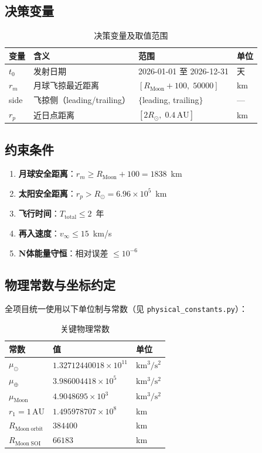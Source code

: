 \documentclass[a4paper,12pt]{article}
\begin{document}
\subsection{决策变量}

\begin{table}[H]
  \centering
  \caption{决策变量及取值范围}\label{tab:vars}
  \begin{tabular}{llll}
    \toprule
    变量 & 含义 & 范围 & 单位 \\
    \midrule
    $t_0$ & 发射日期 & 2026-01-01 至 2026-12-31 & 天 \\
    $r_m$ & 月球飞掠最近距离 & $[R_{\mathrm{Moon}}+100,\; 50000]$ & km \\
    side & 飞掠侧（leading/trailing） & $\{$leading, trailing$\}$ & --- \\
    $r_p$ & 近日点距离 & $[2R_{\odot},\; 0.4\,\mathrm{AU}]$ & km \\
    \bottomrule
  \end{tabular}
\end{table}

\subsection{约束条件}

\begin{enumerate}[label=C\arabic*.]
  \item \textbf{月球安全距离}：$r_m \ge R_{\mathrm{Moon}} + 100 = 1838$~km
  \item \textbf{太阳安全距离}：$r_p > R_{\odot} = 6.96 \times 10^5$~km
  \item \textbf{飞行时间}：$T_{\mathrm{total}} \le 2$~年
  \item \textbf{再入速度}：$v_\infty \le 15$~km/s
  \item \textbf{N体能量守恒}：相对误差 $\le 10^{-6}$
\end{enumerate}

\subsection{物理常数与坐标约定}

全项目统一使用以下单位制与常数（见 \texttt{physical\_constants.py}）：

\begin{table}[H]
  \centering
  \caption{关键物理常数}
  \begin{tabular}{lll}
    \toprule
    常数 & 值 & 单位 \\
    \midrule
    $\mu_\odot$ & $1.32712440018 \times 10^{11}$ & $\mathrm{km^3/s^2}$ \\
    $\mu_\oplus$ & $3.986004418 \times 10^5$ & $\mathrm{km^3/s^2}$ \\
    $\mu_{\mathrm{Moon}}$ & $4.9048695 \times 10^3$ & $\mathrm{km^3/s^2}$ \\
    $r_1 = 1\,\mathrm{AU}$ & $1.495978707 \times 10^8$ & km \\
    $R_{\mathrm{Moon\;orbit}}$ & $384400$ & km \\
    $R_{\mathrm{Moon\;SOI}}$ & $66183$ & km \\
    \bottomrule
  \end{tabular}
\end{table}
\end{document}
